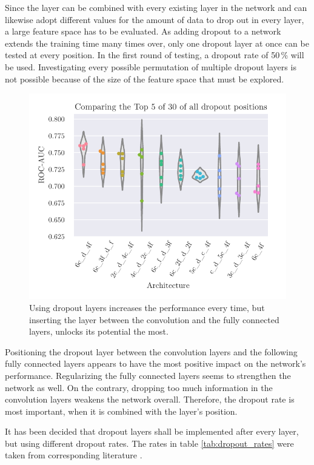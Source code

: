 Since the layer can be combined with every existing layer in the network
and can likewise adopt different values for the amount of data to drop out in every layer,
a large feature space has to be evaluated.
As adding dropout to a network extends the training time many times over,
only one dropout layer at once can be tested at every position.
In the first round of testing, a dropout rate of \num{50}\,\% will be used.
Investigating every possible permutation of multiple dropout layers is not possible
because of the size of the feature space that must be explored.

\begin{figure}
    \centering
    \includegraphics[scale=1]{Plots/Dropout_Positions.pdf}
    \caption{Using dropout layers increases the performance every time, but inserting the layer between the convolution and the fully connected layers, unlocks its potential the most.}
    \label{fig:random_dropout}
\end{figure}

Positioning the dropout layer between the convolution layers and the following fully connected layers
appears to have the most positive impact on the network's performance.
Regularizing the fully connected layers seems to strengthen the network as well.
On the contrary, dropping too much information in the convolution layers weakens the network overall.
Therefore, the dropout rate is most important, when it is combined with the layer's position.

It has been decided that dropout layers shall be implemented after every layer, but using different dropout rates.
The rates in table \ref{tab:dropout_rates} were taken from corresponding literature \cite{deeplearning}.

